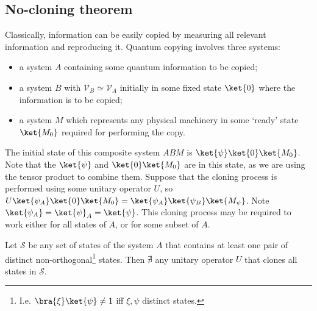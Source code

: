 \subsection{No-cloning theorem}
Classically, information can be easily copied by measuring all relevant information and reproducing it.
Quantum copying involves three systems:
\begin{itemize}
    \item a system $A$ containing some quantum information to be copied;
    \item a system $B$ with $\mathcal V_B \simeq \mathcal V_A$ initially in some fixed state $\ket{0}$ where the information is to be copied;
    \item a system $M$ which represents any physical machinery in some `ready' state $\ket{M_0}$ required for performing the copy.
\end{itemize}
The initial state of this composite system $ABM$ is $\ket{\psi} \ket{0} \ket{M_0}$.
Note that the $\ket{\psi}$ and $\ket{0}\ket{M_0}$ are  in this state, as we are using the tensor product to combine them.
Suppose that the cloning process is performed using some unitary operator $U$, so $U\ket{\psi_A}\ket{0}\ket{M_0} = \ket{\psi_A}\ket{\psi_B}\ket{M_\psi}$.
Note $\ket{\psi_A} = \ket{\psi}_A = \ket{\psi}$.
This cloning process may be required to work either for all states of $A$, or for some subset of $A$.
\begin{theorem}
    Let $\mathcal S$ be any set of states of the system $A$ that contains at least one pair of distinct non-orthogonal\footnote{I.e. $\bra{\xi}\ket{\psi} \neq 1$ iff $\xi, \psi$ distinct states.} states.
    Then $\nexists$ any unitary operator $U$ that clones all states in $\mathcal S$.
\end{theorem}

